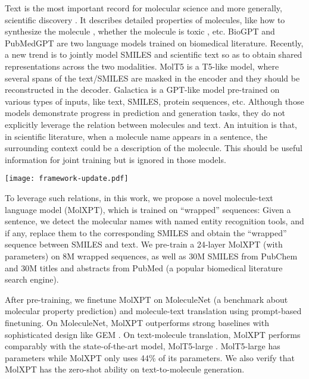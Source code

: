 \documentclass[11pt]{article}
\newcommand{\ourM}{MolXPT}
\begin{document}
Text is the most important record for molecular science and more generally, scientific discovery \cite{beltagy-etal-2019-scibert}. It describes detailed properties of molecules, like how to synthesize the molecule \cite{feng2016sulfur},  whether the molecule is toxic \cite{juurlink2003drug}, etc. BioGPT \citep{bioGPT} and PubMedGPT \citep{pubmedGPT} are two language  models trained on biomedical literature. Recently, a new trend is to jointly model SMILES and scientific text so as to obtain  shared representations across the two modalities. MolT5 is a T5-like \citep{2020t5} model, where several spans of the text/SMILES are masked in the encoder and they should be reconstructed in the decoder. Galactica \citep{taylor2022galactica} is a GPT-like \cite{GPT3} model  pre-trained on various types of inputs, like text, SMILES, protein sequences, etc. Although those models demonstrate progress in prediction and generation tasks, they do not explicitly leverage the relation between molecules and text. An intuition is that, in scientific literature, when a molecule name appears in a sentence, the surrounding context could be a description of the molecule. This should be useful information for joint training but is ignored in those models. 

\begin{figure*}[!t]
\centering
\texttt{[image: framework-update.pdf]}
\caption{Framework of \ourM{}. \ourM{} is pretrained on text from PubMed, SMILES from PubChem and wrapped sequences between SMILES and text. The wrapped sequences are obtained by applying NER and entity linking to text and then replacing matched molecular mentions with SMILES. \ourM{} can be finetuned for various text and molecular downstream tasks, like molecular property prediction and molecule-text translation.}
\label{flowchart}
\end{figure*}

To leverage such relations, in this work, we propose a novel molecule-text language model (\ourM{}), which is trained on ``wrapped'' sequences: Given a sentence, we detect the molecular names with named entity recognition tools, and if any, replace them to the corresponding SMILES and obtain the ``wrapped'' sequence between SMILES and text. We pre-train a 24-layer \ourM{} (with  parameters) on 8M wrapped sequences, as well as 30M SMILES from PubChem \citep{pubchem} and 30M titles and abstracts from PubMed (a popular biomedical literature search engine).

After pre-training, we finetune \ourM{} on MoleculeNet (a benchmark about molecular property prediction) \citep{moleculenet} and molecule-text translation \citep{molt5} using prompt-based finetuning. On MoleculeNet, \ourM{}  outperforms strong baselines with sophisticated design like GEM \citep{fang2022geometry}. On text-molecule translation, \ourM{} performs comparably with the state-of-the-art model, MolT5-large \cite{molt5}. MolT5-large has  parameters while \ourM{} only uses 44\% of its parameters.  We also verify that \ourM{} has the zero-shot ability on text-to-molecule generation. 
\end{document}
